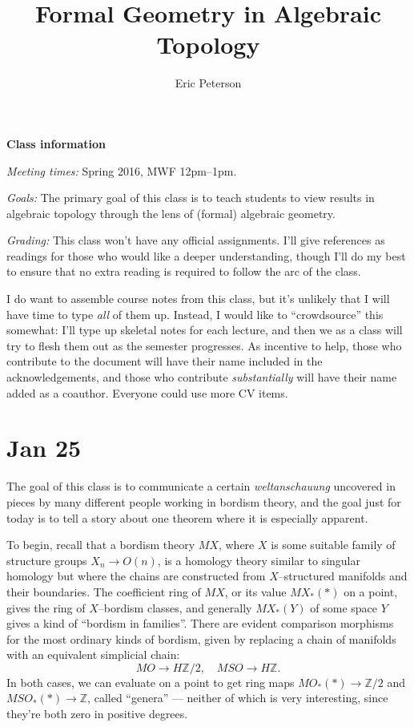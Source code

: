\documentclass{amsart}
\title{Formal Geometry in Algebraic Topology}
\author{Eric Peterson}
\newcommand{\Z}{\mathbb Z}
\newcommand{\<}{\langle}
\renewcommand{\>}{\rangle}
\numberwithin{equation}{section}
\theoremstyle{plain}
\theoremstyle{definition}
\theoremstyle{remark}
\begin{document}
\maketitle

\textbf{Class information}

\vspace{2\baselineskip} \noindent \textit{Meeting times: }
Spring 2016, MWF 12pm--1pm.

\vspace{2\baselineskip} \noindent \textit{Goals: }
The primary goal of this class is to teach students to view results in algebraic topology through the lens of (formal) algebraic geometry.

\vspace{2\baselineskip} \noindent \textit{Grading: }
This class won't have any official assignments. I'll give references as readings for those who would like a deeper understanding, though I'll do my best to ensure that no extra reading is required to follow the arc of the class.

I do want to assemble course notes from this class, but it's unlikely that I will have time to type \emph{all} of them up. Instead, I would like to ``crowdsource'' this somewhat: I'll type up skeletal notes for each lecture, and then we as a class will try to flesh them out as the semester progresses. As incentive to help, those who contribute to the document will have their name included in the acknowledgements, and those who contribute \emph{substantially} will have their name added as a coauthor. Everyone could use more CV items.



\newpage

\section{Jan 25}

The goal of this class is to communicate a certain \textit{weltanschauung} uncovered in pieces by many different people working in bordism theory, and the goal just for today is to tell a story about one theorem where it is especially apparent.

To begin, recall that a bordism theory $MX$, where $X$ is some suitable family of structure groups $X_n \to O(n)$, is a homology theory similar to singular homology but where the chains are constructed from $X$--structured manifolds and their boundaries.  The coefficient ring of $MX$, or its value $MX_*(*)$ on a point, gives the ring of $X$--bordism classes, and generally $MX_*(Y)$ of some space $Y$ gives a kind of ``bordism in families''.  There are evident comparison morphisms for the most ordinary kinds of bordism, given by replacing a chain of manifolds with an equivalent simplicial chain: \[MO \to H\Z/2, \quad MSO \to H\Z.\] In both cases, we can evaluate on a point to get ring maps $MO_*(*) \to \Z/2$ and $MSO_*(*) \to \Z$, called ``genera'' --- neither of which is very interesting, since they're both zero in positive degrees.
\end{document}
